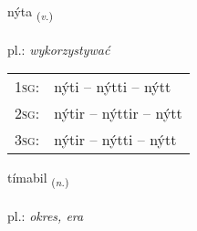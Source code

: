 \documentclass[frontgrid, backgrid]{flacards}\usepackage[]{graphicx}\usepackage[]{xcolor}
\begin{document}
\renewcommand{\flhead}{\vskip5pt \fboxsep=0pt {\small\bfseries\footnotesize Sagnorð | Verb}}
\renewcommand{\fcfoot}{\vskip5pt \fboxsep=0pt \hspace{2pt}{\small\bfseries\footnotesize 1K}}

\renewcommand{\blhead}{\vskip5pt {\small\bfseries\footnotesize Sagnorð | Verb }}
\renewcommand{\bcfoot}{\vskip5pt \hspace{2pt}{\small\bfseries\footnotesize 1K}}


{nýta \small{\textsubscript{(\textit{v.})}} \\[1ex] %
\textphonetic{[niːta]} \\
pl.: \emph{wykorzystywać} \\  [2ex]
\renewcommand*{\arraystretch}{0.8}
\begin{tabular}{p{1cm}l}
\textsc{1sg}: & nýti -- nýtti -- nýtt \\ 
\textsc{2sg}: & nýtir -- nýttir -- nýtt \\ 
\textsc{3sg}: & nýtir -- nýtti -- nýtt \\ 
\end{tabular}
}

\renewcommand{\flhead}{\vskip5pt \fboxsep=0pt {\small\bfseries\footnotesize Nafnorð | Noun}}
\renewcommand{\fcfoot}{\vskip5pt \fboxsep=0pt \hspace{2pt}{\small\bfseries\footnotesize 1K}}

\renewcommand{\blhead}{\vskip5pt {\small\bfseries\footnotesize Nafnorð | Noun }}
\renewcommand{\bcfoot}{\vskip5pt \hspace{2pt}{\small\bfseries\footnotesize 1K}}


{tímabil \small{\textsubscript{(\textit{n.})}} \\[1ex] %
\textphonetic{[tʰiːmapɪl]} \\
pl.: \emph{okres, era} \\  [2ex]
\renewcommand*{\arraystretch}{0.8}
}
\end{document}
